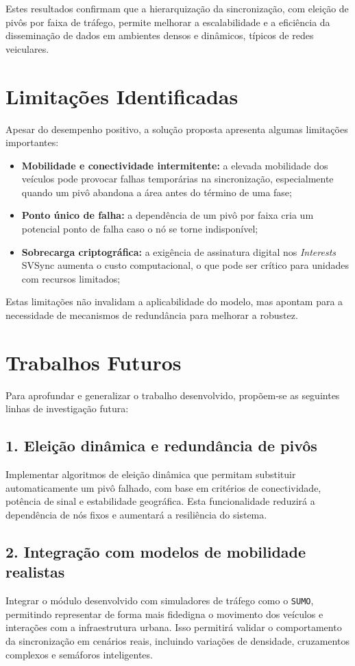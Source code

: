 Estes resultados confirmam que a hierarquização da sincronização, com eleição de pivôs por faixa de tráfego, permite melhorar a escalabilidade e a eficiência da disseminação de dados em ambientes densos e dinâmicos, típicos de redes veiculares.

\section{Limitações Identificadas}
Apesar do desempenho positivo, a solução proposta apresenta algumas limitações importantes:
\begin{itemize}
\item \textbf{Mobilidade e conectividade intermitente:} a elevada mobilidade dos veículos pode provocar falhas temporárias na sincronização, especialmente quando um pivô abandona a área antes do término de uma fase;
\item \textbf{Ponto único de falha:} a dependência de um pivô por faixa cria um potencial ponto de falha caso o nó se torne indisponível;
\item \textbf{Sobrecarga criptográfica:} a exigência de assinatura digital nos \textit{Interests} \gls{SVSync} aumenta o custo computacional, o que pode ser crítico para unidades com recursos limitados;
\end{itemize}

Estas limitações não invalidam a aplicabilidade do modelo, mas apontam para a necessidade de mecanismos de redundância para melhorar a robustez.

\section{Trabalhos Futuros}
Para aprofundar e generalizar o trabalho desenvolvido, propõem-se as seguintes linhas de investigação futura:

\subsection*{1. Eleição dinâmica e redundância de pivôs}
Implementar algoritmos de eleição dinâmica que permitam substituir automaticamente um pivô falhado, com base em critérios de conectividade, potência de sinal e estabilidade geográfica. Esta funcionalidade reduzirá a dependência de nós fixos e aumentará a resiliência do sistema.

\subsection*{2. Integração com modelos de mobilidade realistas}
Integrar o módulo desenvolvido com simuladores de tráfego como o \texttt{SUMO}, permitindo representar de forma mais fidedigna o movimento dos veículos e interações com a infraestrutura urbana. Isso permitirá validar o comportamento da sincronização em cenários reais, incluindo variações de densidade, cruzamentos complexos e semáforos inteligentes.


